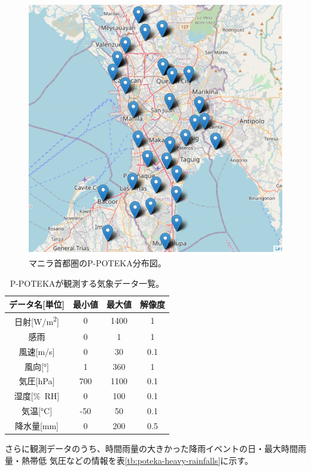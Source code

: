 \begin{figure}[H]
\begin{center}
\includegraphics[width=0.8\linewidth]{fig/methodologies/poteka-distribution-map.png}
\captionsetup{width=0.8\linewidth}
\caption{マニラ首都圏のP-POTEKA分布図。}
\label{fig:poteka-distribution-map}
\end{center}
\end{figure}


\begin{table}[h]
\centering
\begin{tabular}{cccc}
\hline
データ名[単位] & 最小値 & 最大値 & 解像度 \\
\hline \hline
日射[\si{W/m^{2}}] & 0 & 1400 & 1 \\
感雨 & 0 & 1 & 1 \\
風速[\si{m/s}] & 0 & 30 & 0.1 \\
風向[\si{\degree}] & 1 & 360 & 1 \\
気圧[\si{hPa}] & 700 & 1100 & 0.1 \\
湿度[\si{\%RH}] & 0 & 100 & 0.1 \\
気温[\si{\degreeCelsius}] & -50 & 50 & 0.1 \\
降水量[\si{mm}] & 0 & 200 & 0.5 \\
\hline
\end{tabular}
\caption{P-POTEKAが観測する気象データ一覧。}
\label{tb:poteka-observation-parameters}
\end{table}

さらに観測データのうち、時間雨量の大きかった降雨イベントの日・最大時間雨量・熱帯低
気圧などの情報を表\ref{tb:poteka-heavy-rainfalls}に示す。

